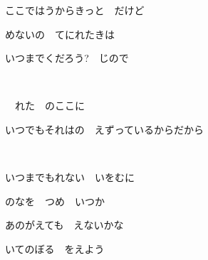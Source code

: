 ここではうからきっと　だけど

めないの　てにれたきは

いつまでくだろう?　じので

~

　れた　のここに

いつでもそれはの　えずっているからだから

~

いつまでもれない　いをむに

のなを　つめ　いつか

あのがえても　えないかな

いてのぼる　をえよう

